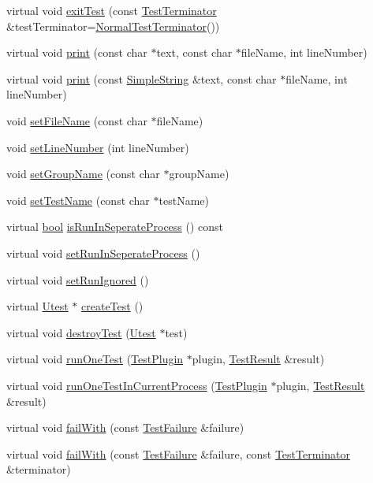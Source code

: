 \begin{DoxyCompactItemize}
\item 
virtual void \hyperlink{class_utest_shell_a458328ad1ce8e11040bc388f27d26975}{exit\+Test} (const \hyperlink{class_test_terminator}{Test\+Terminator} \&test\+Terminator=\hyperlink{class_normal_test_terminator}{Normal\+Test\+Terminator}())
\item 
virtual void \hyperlink{class_utest_shell_a9e7f161718569c365ee9bc9b5c3bfd28}{print} (const char $\ast$text, const char $\ast$file\+Name, int line\+Number)
\item 
virtual void \hyperlink{class_utest_shell_a864d937ec0d0bc780e4495a95ce79bb5}{print} (const \hyperlink{class_simple_string}{Simple\+String} \&text, const char $\ast$file\+Name, int line\+Number)
\item 
void \hyperlink{class_utest_shell_a276904542d6a7885b80ea9e494e8bc20}{set\+File\+Name} (const char $\ast$file\+Name)
\item 
void \hyperlink{class_utest_shell_ab16999ec38298569f6eb6933ca0416b3}{set\+Line\+Number} (int line\+Number)
\item 
void \hyperlink{class_utest_shell_a1bd15ccf10b94d820271b74ff6e9c534}{set\+Group\+Name} (const char $\ast$group\+Name)
\item 
void \hyperlink{class_utest_shell_adcba7e1f936ea12d57c7ef2949c9fd08}{set\+Test\+Name} (const char $\ast$test\+Name)
\item 
virtual \hyperlink{avb__gptp_8h_af6a258d8f3ee5206d682d799316314b1}{bool} \hyperlink{class_utest_shell_a24f44ff874b460e5e055050af80fb302}{is\+Run\+In\+Seperate\+Process} () const 
\item 
virtual void \hyperlink{class_utest_shell_a2bcc7ce67efa05a04dbc8ab8760d1854}{set\+Run\+In\+Seperate\+Process} ()
\item 
virtual void \hyperlink{class_utest_shell_a861854e4e01f41f5bcc490a0dc0621b0}{set\+Run\+Ignored} ()
\item 
virtual \hyperlink{class_utest}{Utest} $\ast$ \hyperlink{class_utest_shell_a7dd87cb4b46bb708bc2c1f9bffa54adb}{create\+Test} ()
\item 
virtual void \hyperlink{class_utest_shell_a797d022228765f30bd7455a863011797}{destroy\+Test} (\hyperlink{class_utest}{Utest} $\ast$test)
\item 
virtual void \hyperlink{class_utest_shell_a86b5bcccee3889c16117ea5cccee12b5}{run\+One\+Test} (\hyperlink{class_test_plugin}{Test\+Plugin} $\ast$plugin, \hyperlink{class_test_result}{Test\+Result} \&result)
\item 
virtual void \hyperlink{class_utest_shell_a468a088beac3c881bdaea58bc6acaecf}{run\+One\+Test\+In\+Current\+Process} (\hyperlink{class_test_plugin}{Test\+Plugin} $\ast$plugin, \hyperlink{class_test_result}{Test\+Result} \&result)
\item 
virtual void \hyperlink{class_utest_shell_ad50ae28f5ad9f1d224832cb1f89365a7}{fail\+With} (const \hyperlink{class_test_failure}{Test\+Failure} \&failure)
\item 
virtual void \hyperlink{class_utest_shell_a5deb4c5d28a360e44345deea323d5db7}{fail\+With} (const \hyperlink{class_test_failure}{Test\+Failure} \&failure, const \hyperlink{class_test_terminator}{Test\+Terminator} \&terminator)
\end{DoxyCompactItemize}
